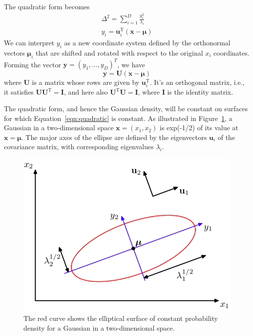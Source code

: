\documentclass[5p,sort&compress]{elsarticle}
\begin{document}
The quadratic form becomes
\begin{equation}\label{eqn:quadratic}
\begin{aligned}{\Delta^{2}=\sum_{i=1}^{D} \frac{y_{i}^{2}}{\lambda_{i}}} \\ {y_{i}=\mathbf{u}_{i}^{\mathrm{T}}(\mathbf{x}-\boldsymbol{\mu})}\end{aligned}
\end{equation}
We can interpret ${y_i}$ as a new coordinate system defined by the orthonormal vectors $\boldsymbol{\mu}_i$ that are shifted and rotated with respect to the original $x_i$ coordinates. Forming the vector $\boldsymbol{y} = (y_1, \ldots, y_D)^T$, we have
\begin{equation}
\mathbf{y}=\mathbf{U}(\mathbf{x}-\boldsymbol{\mu})
\end{equation}
where $\mathbf{U}$ is a matrix whose rows are given by $\mathbf{u}_{i}^{\mathrm{T}}$. It's an orthogonal matrix, i.e., it satisfies $\mathbf{U}\mathbf{U}^{\mathrm{T}} = \mathbf{I}$, and here also $\mathbf{U}^{\mathrm{T}} \mathbf{U} = \mathbf{I}$, where $\mathbf{I}$ is the identity matrix.

The quadratic form, and hence the Gaussian density, will be constant on surfaces for which Equation~\ref{eqn:quadratic} is constant. As illustrated in Figure~\ref{fig:2.7}, a Gaussian in a two-dimensional space $\boldsymbol{x} = (x_1, x_2)$ is exp(-1/2) of its value at $\boldsymbol{x} = \boldsymbol{\mu}$. The major axes of the ellipse are defined by the eigenvectors $\boldsymbol{u}_i$ of the covariance matrix, with corresponding eigenvalues $\lambda_i$.

\begin{figure}[ht]
     \centering
     \includegraphics[width = \linewidth]{figure/fig2-7.png}
     \caption{The red curve shows the elliptical surface of constant probability density for a Gaussian in a two-dimensional space.}
     \label{fig:2.7}
\end{figure}
\end{document}
